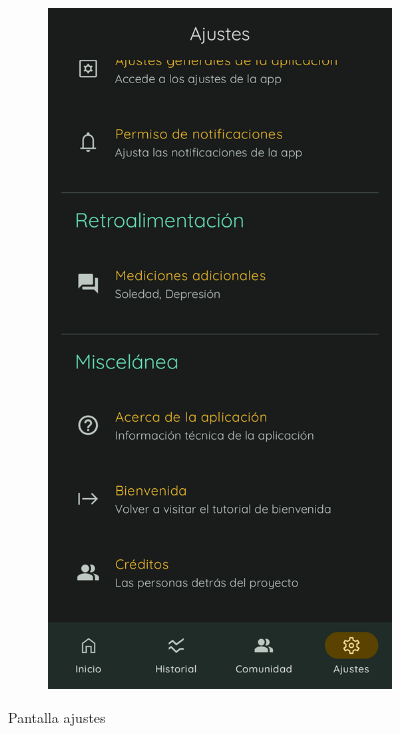 \begin{figure}[htbp]
\begin{subfigure}[c]{0.29\textwidth}
                	\end{subfigure}
                    \hspace{0.05\textwidth}
                	\begin{subfigure}[c]{0.29\textwidth}
                		\centering
                		\includegraphics[width=1\linewidth]{figures/pantallas/Ajustes 3.png}
                	\end{subfigure}
                	\caption{Pantalla ajustes}
                	\label{figure:implementacion:pantalla:ajustes}
                \end{figure}

